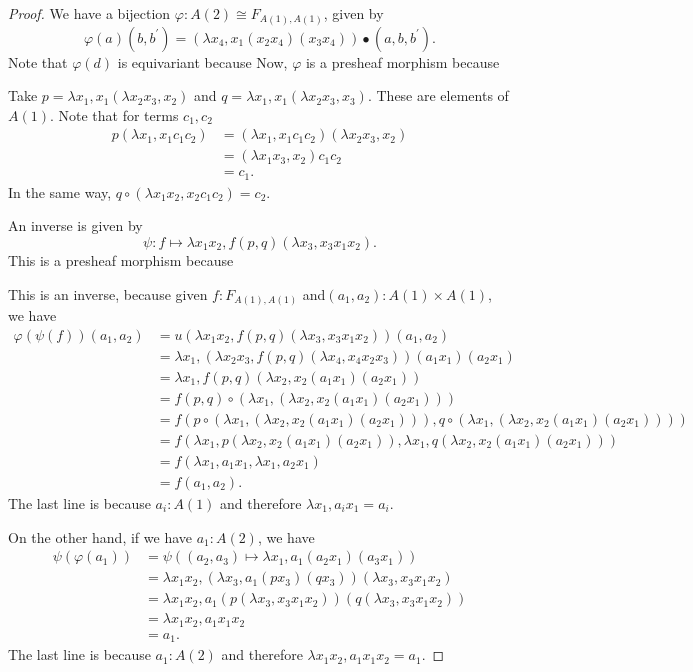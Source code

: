 \begin{proof}
  We have a bijection $ \varphi: A(2) \cong F_{A(1), A(1)} $, given by
  \[ \varphi(a)(b, b^\prime) = (\lambda x_4, x_1 (x_2 x_4) (x_3 x_4)) \bullet (a, b, b^\prime). \]
  Note that $ \varphi(d) $ is equivariant because \TODO
  Now, $ \varphi $ is a presheaf morphism because \TODO

  Take $ p = \lambda x_1, x_1 (\lambda x_2 x_3, x_2) $ and $ q = \lambda x_1, x_1 (\lambda x_2 x_3, x_3) $. These are elements of $ A(1) $. Note that for terms $ c_1, c_2 $
  \begin{align*}
    p (\lambda x_1, x_1 c_1 c_2)
    &= (\lambda x_1, x_1 c_1 c_2) (\lambda x_2 x_3, x_2)\\
    &= (\lambda x_1 x_3, x_2) c_1 c_2\\
    &= c_1.
  \end{align*}
  In the same way, $ q \circ (\lambda x_1 x_2, x_2 c_1 c_2) = c_2 $.

  An inverse is given by
  \[ \psi: f \mapsto \lambda x_1 x_2, f(p, q)(\lambda x_3, x_3 x_1 x_2). \]
  This is a presheaf morphism because \TODO

  This is an inverse, because given $ f: F_{A(1), A(1)} $ and$ (a_1, a_2): A(1) \times A(1) $, we have
  \begin{align*}
    \varphi(\psi(f))(a_1, a_2) &= u(\lambda x_1 x_2, f(p, q)(\lambda x_3, x_3 x_1 x_2))(a_1, a_2)\\
    &= \lambda x_1, (\lambda x_2 x_3, f(p, q)(\lambda x_4, x_4 x_2 x_3)) (a_1 x_1) (a_2 x_1)\\
    &= \lambda x_1, f(p, q)(\lambda x_2, x_2 (a_1 x_1) (a_2 x_1))\\
    &= f(p, q) \circ (\lambda x_1, (\lambda x_2, x_2 (a_1 x_1) (a_2 x_1)))\\
    &= f(p \circ (\lambda x_1, (\lambda x_2, x_2 (a_1 x_1) (a_2 x_1))), q \circ (\lambda x_1, (\lambda x_2, x_2 (a_1 x_1) (a_2 x_1))))\\
    &= f(\lambda x_1, p (\lambda x_2, x_2 (a_1 x_1) (a_2 x_1)), \lambda x_1, q (\lambda x_2, x_2 (a_1 x_1) (a_2 x_1)))\\
    &= f(\lambda x_1, a_1 x_1, \lambda x_1, a_2 x_1)\\
    &= f(a_1, a_2).
  \end{align*}
  The last line is because $ a_i : A(1) $ and therefore $ \lambda x_1, a_i x_1 = a_i $.

  On the other hand, if we have $ a_1: A(2) $, we have
  \begin{align*}
    \psi(\varphi(a_1)) &= \psi((a_2, a_3) \mapsto \lambda x_1, a_1 (a_2 x_1) (a_3 x_1))\\
    &= \lambda x_1 x_2, (\lambda x_3, a_1 (p x_3) (q x_3)) (\lambda x_3, x_3 x_1 x_2)\\
    &= \lambda x_1 x_2, a_1 (p (\lambda x_3, x_3 x_1 x_2)) (q (\lambda x_3, x_3 x_1 x_2))\\
    &= \lambda x_1 x_2, a_1 x_1 x_2\\
    &= a_1.
  \end{align*}
  The last line is because $ a_1 : A(2) $ and therefore $ \lambda x_1 x_2, a_1 x_1 x_2 = a_1 $.


\end{proof}
